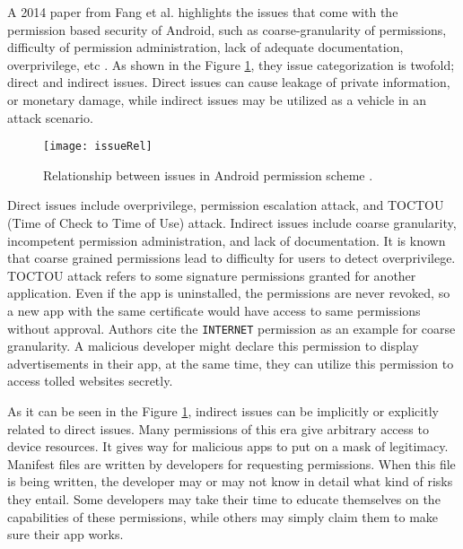 \documentclass[
  a4paper,  %
  twoside,  %
  bibliography=totoc,
  headsepline,
  cleardoublepage=empty,
  parskip=half,
  draft=false,
  open=any
]{scrbook}
\begin{document}
A 2014 paper from Fang et al. highlights the issues that come with the permission based security of Android, such as coarse-granularity of permissions, difficulty of permission administration, lack of adequate documentation, overprivilege, etc \cite{fang2014}. As shown in the Figure \ref{issueRel}, they issue categorization is twofold; direct and indirect issues. Direct issues can cause leakage of private information, or monetary damage, while indirect issues may be utilized as a vehicle in an attack scenario.
\begin{figure}\centering
	\texttt{[image: issueRel]}
	\caption{Relationship between issues in Android permission scheme \cite{fang2014}.}
	\label{issueRel}
\end{figure} 
Direct issues include overprivilege, permission escalation attack, and TOCTOU (Time of Check to Time of Use) attack. Indirect issues include coarse granularity, incompetent permission administration, and lack of documentation. It is known that coarse grained permissions lead to difficulty for users to detect overprivilege. TOCTOU attack refers to some signature permissions granted for another application. Even if the app is uninstalled, the permissions are never revoked, so a new app with the same certificate would have access to same permissions without approval. Authors cite the \texttt{INTERNET} permission as an example for coarse granularity. A malicious developer might declare this permission to display advertisements in their app, at the same time, they can utilize this permission to access tolled websites secretly.

As it can be seen in the Figure \ref{issueRel}, indirect issues can be implicitly or explicitly related to direct issues. Many permissions of this era give arbitrary access to device resources. It gives way for malicious apps to put on a mask of legitimacy. Manifest files are written by developers for requesting permissions. When this file is being written, the developer may or may not know in detail what kind of risks they entail. Some developers may take their time to educate themselves on the capabilities of these permissions, while others may simply claim them to make sure their app works. 
\end{document}

